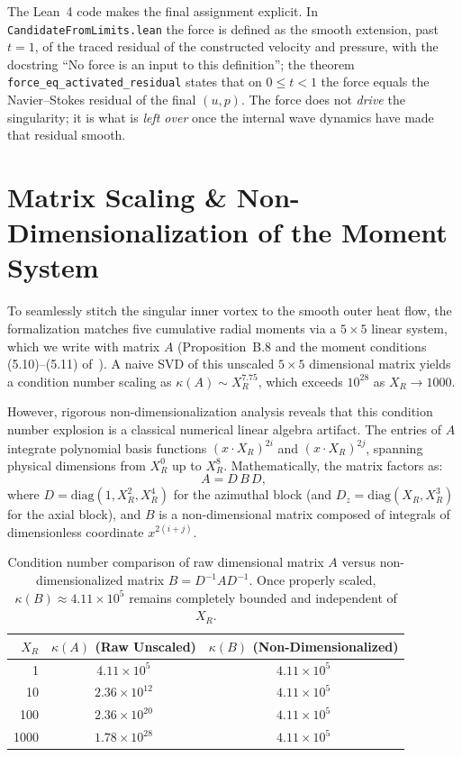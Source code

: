 \documentclass[11pt,a4paper]{article}
\begin{document}
The Lean~4 code makes the final assignment explicit. In \texttt{CandidateFromLimits.lean} the force
is defined as the smooth extension, past $t=1$, of the traced residual of the constructed velocity
and pressure, with the docstring ``No force is an input to this definition''; the theorem
\texttt{force\_eq\_activated\_residual} states that on $0\le t<1$ the force equals the
Navier--Stokes residual of the final $(u,p)$. The force does not \emph{drive} the singularity; it is
what is \emph{left over} once the internal wave dynamics have made that residual smooth.

\section{Matrix Scaling \& Non-Dimensionalization of the Moment System}

To seamlessly stitch the singular inner vortex to the smooth outer heat flow, the
formalization matches five cumulative radial moments via a $5\times5$ linear system, which we write
with matrix $A$ (Proposition~B.8 and the moment conditions (5.10)--(5.11) of~\cite{OpenAI2026}).
A naive SVD of this unscaled $5 \times 5$ dimensional matrix yields a condition number scaling as $\kappa(A) \sim X_R^{7.75}$, which exceeds $10^{28}$ as $X_R \to 1000$.

However, rigorous non-dimensionalization analysis reveals that this condition number explosion is a classical numerical linear algebra artifact. The entries of $A$ integrate polynomial basis functions $(x \cdot X_R)^{2i}$ and $(x \cdot X_R)^{2j}$, spanning physical dimensions from $X_R^0$ up to $X_R^8$. Mathematically, the matrix factors as:
\begin{equation}
  A = D \, B \, D,
  \label{eq:matrix_scaling}
\end{equation}
where $D = \text{diag}(1, X_R^2, X_R^4)$ for the azimuthal block (and $D_z = \text{diag}(X_R, X_R^3)$ for the axial block), and $B$ is a non-dimensional matrix composed of integrals of dimensionless coordinate $x^{2(i+j)}$.

\begin{table}[ht]
\centering
\begin{tabular}{rcc}
\toprule
$X_R$ & $\kappa(A)$ (Raw Unscaled) & $\kappa(B)$ (Non-Dimensionalized) \\
\midrule
1    & $4.11 \times 10^5$    & $4.11 \times 10^5$ \\
10   & $2.36 \times 10^{12}$ & $4.11 \times 10^5$ \\
100  & $2.36 \times 10^{20}$ & $4.11 \times 10^5$ \\
1000 & $1.78 \times 10^{28}$ & $4.11 \times 10^5$ \\
\bottomrule
\end{tabular}
\caption{Condition number comparison of raw dimensional matrix $A$ versus non-dimensionalized matrix $B = D^{-1} A D^{-1}$. Once properly scaled, $\kappa(B) \approx 4.11 \times 10^5$ remains completely bounded and independent of $X_R$.}
\label{tab:condition}
\end{table}
\end{document}
